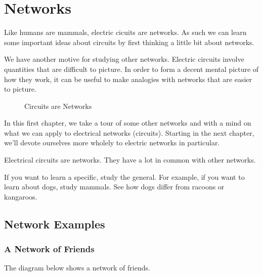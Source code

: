 \chapter{Networks}

Like humans are mammals, electric cicuits are networks. As such we can learn some important ideas about circuits by first thinking a little bit about networks. \par

We have another motive for studying other networks. Electric circuits involve quantities that are difficult to picture. In order to form a decent mental picture of how they work, it can be useful to make analogies with networks that are easier to picture.\par

\begin{figure}[H]
\begin{center}
\caption{Circuits are Networks}
\label{F:1FCAREN}
\end{center}
\end{figure}

In this first chapter, we take a tour of some other networks and with a mind on what we can apply to electrical networks (circuits). Starting in the next chapter, we'll devote ourselves more wholely to electric networks in particular.\par

\begin{bigidea} 
Electrical circuits are networks. They have a lot in common with other networks.
\end{bigidea}

\begin{bigidea} 
If you want to learn a specific, study the general. For example, if you want to learn about dogs, study mammals. See how dogs differ from racoons or kangaroos. 
\end{bigidea}

\section{Network Examples}

\subsection{A Network of Friends}
The diagram below shows a network of friends.

